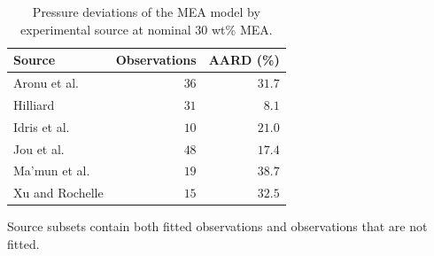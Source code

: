 \begin{table}[!htbp]\small\setlength{\tabcolsep}{3pt}\centering
\caption{Pressure deviations of the MEA model by experimental source at nominal 30 wt\% MEA.}\label{tab:pressure-sources}
\begin{tabular}{@{}lrr@{}}
\toprule
Source & Observations & AARD (\%) \\
\midrule
Aronu et al. \cite{Aronu2011} & $36$ & $31.7$ \\
Hilliard \cite{Hilliard2008} & $31$ & $8.1$ \\
Idris et al. \cite{idrisSpeciationMEACO2Adducts2014} & $10$ & $21.0$ \\
Jou et al. \cite{Jou1995} & $48$ & $17.4$ \\
Ma’mun et al. \cite{Mamun2005} & $19$ & $38.7$ \\
Xu and Rochelle \cite{Xu2011} & $15$ & $32.5$ \\
\bottomrule
\end{tabular}
\par\smallskip\parbox{\linewidth}{\footnotesize\raggedright Source subsets contain both fitted observations and observations that are not fitted.}
\end{table}
